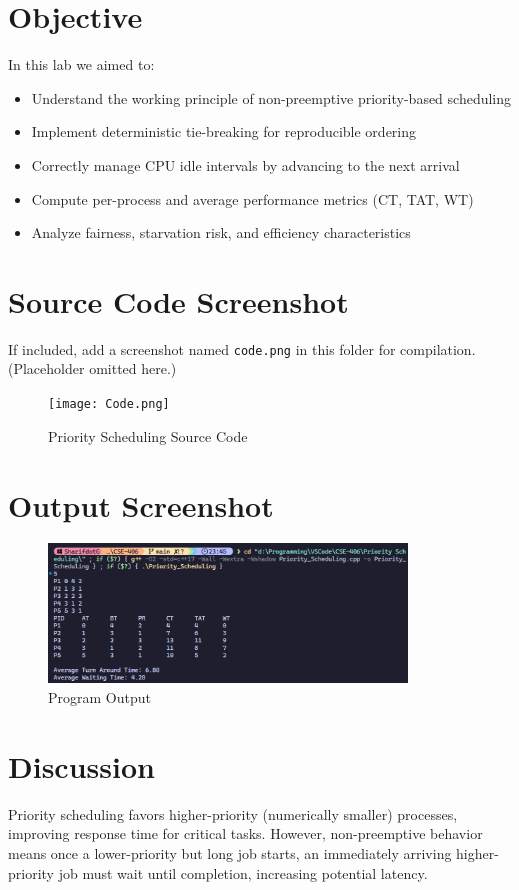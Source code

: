 \documentclass[12pt,a4paper]{article}
\begin{document}
\section{Objective}
In this lab we aimed to:
\begin{itemize}
    \item Understand the working principle of non-preemptive priority-based scheduling
    \item Implement deterministic tie-breaking for reproducible ordering
    \item Correctly manage CPU idle intervals by advancing to the next arrival
    \item Compute per-process and average performance metrics (CT, TAT, WT)
    \item Analyze fairness, starvation risk, and efficiency characteristics
\end{itemize}

\section{Source Code Screenshot}
If included, add a screenshot named \texttt{code.png} in this folder for compilation. (Placeholder omitted here.)

\begin{figure}[H]
  \centering
  \texttt{[image: Code.png]}
  \caption{Priority Scheduling Source Code}
\end{figure}

\section{Output Screenshot}
\begin{figure}[H]
  \centering
  \includegraphics[width=0.85\textwidth]{Screenshot 2025-08-16 234650.png}
  \caption{Program Output}
\end{figure}

\section{Discussion}
Priority scheduling favors higher-priority (numerically smaller) processes, improving response time for critical tasks. However, non-preemptive behavior means once a lower-priority but long job starts, an immediately arriving higher-priority job must wait until completion, increasing potential latency.
\end{document}
